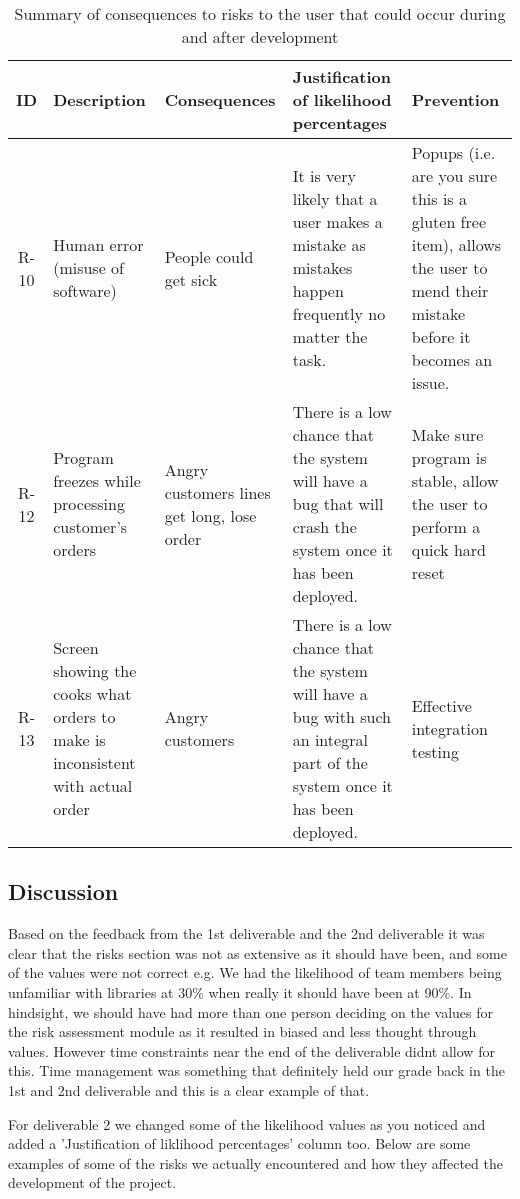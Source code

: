 \begin{table}[!ht]
\centering
\caption{Summary of consequences to risks to the user that could occur during and after development}
\begin{tabularx}{\linewidth}{|c|X|X|X|X|}
	\hline
    ID & Description & Consequences & Justification of likelihood percentages & Prevention \\
    \hline
    R-10 & Human error (misuse of software) & People could get sick & It is very likely that a user makes a mistake as mistakes happen frequently no matter the task. & Popups (i.e. are you sure this is a gluten free item), allows the user to mend their mistake before it becomes an issue. \\
    \hline
    R-12 & Program freezes while processing customer’s orders & Angry customers lines get long, lose order & There is a low chance that the system will have a bug that will crash the system once it has been deployed. & Make sure program is stable, allow the user to perform a quick hard reset \\
    \hline
    R-13 & Screen showing the cooks what orders to make is inconsistent with actual order & Angry customers & There is a low chance that the system will have a bug with such an integral part of the system once it has been deployed. & Effective integration testing \\
    \hline
\end{tabularx}
\end{table}

\subsection{Discussion}

Based on the feedback from the 1st deliverable and the 2nd deliverable it was clear that the risks section was not as extensive as it should have been, and some of the values were not correct e.g. We had the likelihood of team members being unfamiliar with libraries at 30\% when really it should have been at 90\%. In hindsight, we should have had more than one person deciding on the values for the risk assessment module as it resulted in biased and less thought through values. However time constraints near the end of the deliverable didnt allow for this. Time management was something that definitely held our grade back in the 1st and 2nd deliverable and this is a clear example of that.

For deliverable 2 we changed some of the likelihood values as you noticed and added a 'Justification of liklihood percentages' column too. Below are some examples of some of the risks we actually encountered and how they affected the development of the project.

